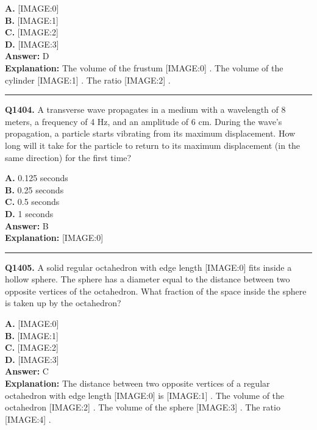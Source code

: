 \documentclass[12pt]{article}
\begin{document}
\textbf{A.} [IMAGE:0] \\
\textbf{B.} [IMAGE:1] \\
\textbf{C.} [IMAGE:2] \\
\textbf{D.} [IMAGE:3] \\

\textbf{Answer:} D \\
\textbf{Explanation:} The volume of the frustum
[IMAGE:0]
. The volume of the cylinder
[IMAGE:1]
. The ratio
[IMAGE:2]
.

\hrule
\vspace{1em}


\noindent
\textbf{Q1404.} A transverse wave propagates in a medium with a wavelength of 8 meters, a frequency of 4 Hz, and an amplitude of 6 cm. During the wave's propagation, a particle starts vibrating from its maximum displacement. How long will it take for the particle to return to its maximum displacement (in the same direction) for the first time?



\textbf{A.} 0.125 seconds \\
\textbf{B.} 0.25
seconds \\
\textbf{C.} 0.5
seconds \\
\textbf{D.} 1
seconds \\

\textbf{Answer:} B \\
\textbf{Explanation:} [IMAGE:0]

\hrule
\vspace{1em}


\noindent
\textbf{Q1405.} A solid regular octahedron with edge length
[IMAGE:0]
fits inside a hollow sphere. The sphere has a diameter equal to the distance between two opposite vertices of the octahedron. What fraction of the space inside the sphere is taken up by the octahedron?



\textbf{A.} [IMAGE:0] \\
\textbf{B.} [IMAGE:1] \\
\textbf{C.} [IMAGE:2] \\
\textbf{D.} [IMAGE:3] \\

\textbf{Answer:} C \\
\textbf{Explanation:} The distance between two opposite vertices of a regular octahedron with edge length
[IMAGE:0]
is
[IMAGE:1]
. The volume of the octahedron
[IMAGE:2]
. The volume of the sphere
[IMAGE:3]
. The ratio
[IMAGE:4]
.
\end{document}

